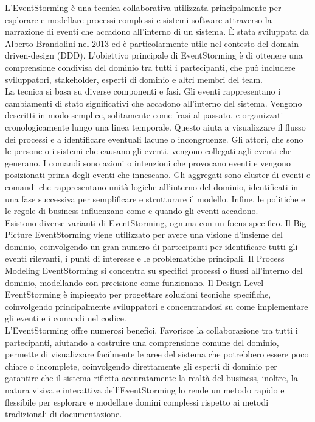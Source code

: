 L'EventStorming è una tecnica collaborativa utilizzata principalmente per esplorare e modellare processi complessi e sistemi software attraverso la narrazione di eventi che accadono all'interno di un sistema. È stata sviluppata da Alberto Brandolini nel 2013 ed è particolarmente utile nel contesto del \gls{domain-driven-design} (DDD). L'obiettivo principale di EventStorming è di ottenere una comprensione condivisa del dominio tra tutti i partecipanti, che può includere sviluppatori, stakeholder, esperti di dominio e altri membri del team.\\
La tecnica si basa su diverse componenti e fasi. Gli eventi rappresentano i cambiamenti di stato significativi che accadono all'interno del sistema. Vengono descritti in modo semplice, solitamente come frasi al passato, e organizzati cronologicamente lungo una linea temporale. Questo aiuta a visualizzare il flusso dei processi e a identificare eventuali lacune o incongruenze. Gli attori, che sono le persone o i sistemi che causano gli eventi, vengono collegati agli eventi che generano. I comandi sono azioni o intenzioni che provocano eventi e vengono posizionati prima degli eventi che innescano. Gli aggregati sono cluster di eventi e comandi che rappresentano unità logiche all'interno del dominio, identificati in una fase successiva per semplificare e strutturare il modello. Infine, le politiche e le regole di business influenzano come e quando gli eventi accadono.\\
Esistono diverse varianti di EventStorming, ognuna con un focus specifico. Il Big Picture EventStorming viene utilizzato per avere una visione d'insieme del dominio, coinvolgendo un gran numero di partecipanti per identificare tutti gli eventi rilevanti, i punti di interesse e le problematiche principali. Il Process Modeling EventStorming si concentra su specifici processi o flussi all'interno del dominio, modellando con precisione come funzionano. Il Design-Level EventStorming è impiegato per progettare soluzioni tecniche specifiche, coinvolgendo principalmente sviluppatori e concentrandosi su come implementare gli eventi e i comandi nel codice.\\
L'EventStorming offre numerosi benefici. Favorisce la collaborazione tra tutti i partecipanti, aiutando a costruire una comprensione comune del dominio, permette di visualizzare facilmente le aree del sistema che potrebbero essere poco chiare o incomplete, coinvolgendo direttamente gli esperti di dominio per garantire che il sistema rifletta accuratamente la realtà del business, inoltre, la natura visiva e interattiva dell'EventStorming lo rende un metodo rapido e flessibile per esplorare e modellare domini complessi rispetto ai metodi tradizionali di documentazione.\\

